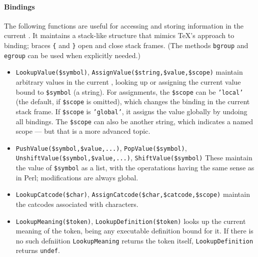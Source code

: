 \documentclass{book}
\newcommand{\ltxcode}{\lstinline[style=inlinelatexml]}
\begin{document}
\paragraph{Bindings} The following functions are useful for accessing and storing
information in the current . It maintains a stack-like structure
that mimics \TeX's approach to binding; braces \verb|{| and \verb|}| open
and close stack frames.  (The  methods \texttt{bgroup} and \texttt{egroup}
can be used when explicitly needed.)
\begin{itemize}
\item \ltxcode|LookupValue($symbol)|, \ltxcode|AssignValue($string,$value,$scope)|
 maintain arbitrary values in the current , looking up or assigning
 the current value  bound to \ltxcode|$symbol| (a string).
 For assignments,  the \ltxcode|$scope| can be \texttt{'local'}
  (the default, if \ltxcode|$scope| is omitted),
  which changes the binding in the current stack frame.
  If \ltxcode|$scope| is \texttt{'global'}, it assigns the value globally
  by undoing all bindings.
  The \ltxcode|$scope| can also be another string, which indicates a named scope
   --- but that is a more advanced topic.
\item \ltxcode|PushValue($symbol,$value,...)|, \ltxcode|PopValue($symbol)|,\hfil\\
      \ltxcode|UnshiftValue($symbol,$value,...)|, \ltxcode|ShiftValue($symbol)|
  These maintain the value of \ltxcode|$symbol| as a list, with the operatations
  having the same sense as in Perl; modifications are always global.
\item \ltxcode|LookupCatcode($char)|, \ltxcode|AssignCatcode($char,$catcode,$scope)|
  maintain the catcodes associated with characters.
\item \ltxcode|LookupMeaning($token)|, \ltxcode|LookupDefinition($token)|
 looks up the current meaning of the token,  being any executable definition bound for it.
 If there is no such defniition \texttt{LookupMeaning} returns the token itself, 
 \texttt{LookupDefinition} returns \texttt{undef}.
\end{itemize}
\end{document}
